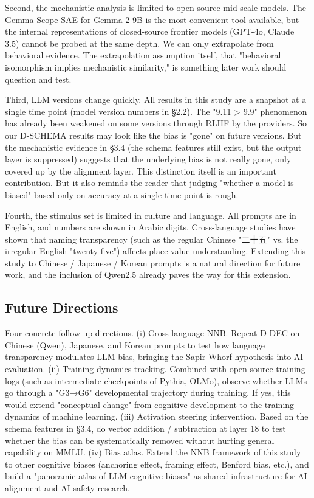 Second, the mechanistic analysis is limited to open-source mid-scale models. The Gemma Scope SAE for Gemma-2-9B is the most convenient tool available, but the internal representations of closed-source frontier models (GPT-4o, Claude 3.5) cannot be probed at the same depth. We can only extrapolate from behavioral evidence. The extrapolation assumption itself, that "behavioral isomorphism implies mechanistic similarity," is something later work should question and test.

Third, LLM versions change quickly. All results in this study are a snapshot at a single time point (model version numbers in §2.2). The "9.11 > 9.9" phenomenon has already been weakened on some versions through RLHF by the providers. So our D-SCHEMA results may look like the bias is "gone" on future versions. But the mechanistic evidence in §3.4 (the schema features still exist, but the output layer is suppressed) suggests that the underlying bias is not really gone, only covered up by the alignment layer. This distinction itself is an important contribution. But it also reminds the reader that judging "whether a model is biased" based only on accuracy at a single time point is rough.

Fourth, the stimulus set is limited in culture and language. All prompts are in English, and numbers are shown in Arabic digits. Cross-language studies have shown that naming transparency (such as the regular Chinese "二十五" vs. the irregular English "twenty-five") affects place value understanding\cite{miller1995}. Extending this study to Chinese / Japanese / Korean prompts is a natural direction for future work, and the inclusion of Qwen2.5 already paves the way for this extension.

\subsection{Future Directions}

Four concrete follow-up directions. (i) Cross-language NNB. Repeat D-DEC on Chinese (Qwen), Japanese, and Korean prompts to test how language transparency modulates LLM bias, bringing the Sapir-Whorf hypothesis into AI evaluation. (ii) Training dynamics tracking. Combined with open-source training logs (such as intermediate checkpoints of Pythia, OLMo), observe whether LLMs go through a "G3→G6" developmental trajectory during training. If yes, this would extend "conceptual change" from cognitive development to the training dynamics of machine learning. (iii) Activation steering intervention. Based on the schema features in §3.4, do vector addition / subtraction at layer 18 to test whether the bias can be systematically removed without hurting general capability on MMLU. (iv) Bias atlas. Extend the NNB framework of this study to other cognitive biases (anchoring effect, framing effect, Benford bias, etc.), and build a "panoramic atlas of LLM cognitive biases" as shared infrastructure for AI alignment and AI safety research.
